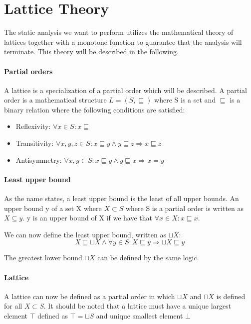 \section{Lattice Theory}\label{lattice}
The static analysis we want to perform utilizes the mathematical theory of lattices together with a monotone function to guarantee that the analysis will terminate.
This theory will be described in the following.

\paragraph{Partial orders}
A lattice is a specialization of a partial order which will be described.
A partial order is a mathematical structure $L = (S, \sqsubseteq)$ where S is a set and $\sqsubseteq$ is a binary relation where the following conditions are satisfied:
\begin{itemize}
  \item Reflexivity: $\forall x \in S : x \sqsubseteq$
  \item Transitivity: $\forall x,y,z \in S : x \sqsubseteq y \wedge y \sqsubseteq z \Rightarrow x \sqsubseteq z$
  \item Antisymmetry: $\forall x,y \in S: x \sqsubseteq y \wedge y \sqsubseteq x \Rightarrow x = y$
\end{itemize}


\paragraph{Least upper bound}
As the name states, a least upper bound is the least of all upper bounds.
An upper bound y of a set X where $ X \subset S$ where S is a partial order is written as $X \subseteq y$.
y is an upper bound of X if we have that $\forall x \in X : x \sqsubseteq x$.

We can now define the least upper bound, written as $\sqcup X$:
\[X \sqsubseteq \sqcup X \wedge \forall y \in S : X \sqsubseteq y \Rightarrow \sqcup X \sqsubseteq y\]

The greatest lower bound $\sqcap X$ can be defined by the same logic.

\paragraph{Lattice}
A lattice can now be defined as a partial order in which $\sqcup X$ and $\sqcap X$ is defined for all $X \subset S$.
It should be noted  that a lattice must have a unique largest element $\top$ defined as $\top = \sqcup S$ and unique smallest element $\bot$ 

